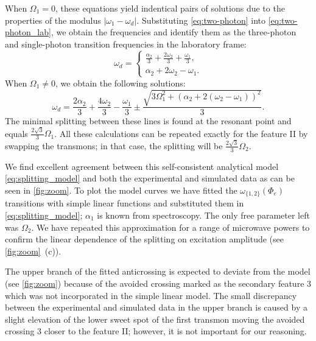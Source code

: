 \documentclass[%
 aps, prx,
 amsmath,amssymb,
 reprint,%
superscriptaddress
]{revtex4-2}
\begin{document}
When $\Omega_1 = 0$, these equations yield indentical pairs of solutions due to the properties of the modulus $|\omega_1 - \omega_d|$. Substituting \autoref{eq:two-photon} into \autoref{eq:two-photon_lab}, we obtain the frequencies and identify them as the three-photon and single-photon transition frequencies in the laboratory frame:
\begin{equation}
\omega_d = \begin{cases} \frac{\alpha_2}{3} + \frac{2 \omega_{2}}{3} + \frac{\omega_{1}}{3}, \\ \alpha_2 + 2 \omega_{2} - \omega_{1}.\end{cases}
\end{equation}
When $\Omega_1 \neq 0$, we obtain the following solutions:
\begin{equation}
\omega_d = \frac{2 \alpha_2}{3} + \frac{4 \omega_{2}}{3} - \frac{\omega_{1}}{3} \pm \frac{\sqrt{3 \Omega_{1}^{2} + \left( \alpha_2 + 2 (\omega_{2} - \omega_{1})\right)^{2}}}{3}.
\label{eq:splitting_model}
\end{equation}
The minimal splitting between these lines is 
found at the resonant point and equals $\frac{2 
\sqrt{3}}{{3}} \Omega_1$. All these calculations 
can be repeated exactly for the feature II by 
swapping the transmons; in that case, the 
splitting will be $\frac{2 \sqrt{3}}{{3}} 
\Omega_2$.

We find excellent agreement between this self-consistent analytical model \autoref{eq:splitting_model} and 
both the experimental and simulated data as can 
be seen in \autoref{fig:zoom}. To plot the model 
curves we have fitted the 
$\omega_{\{1,2\}}(\Phi_e)$ transitions with simple 
linear functions and substituted them in 
\autoref{eq:splitting_model}; $\alpha_1$ is known 
from spectroscopy. The only free parameter left 
was $\Omega_2$. We have repeated this 
approximation for a range of microwave powers to 
confirm the linear dependence of the splitting on 
excitation amplitude (see \autoref{fig:zoom}~(c)).

The upper branch of the fitted anticrossing is expected to deviate from the model (see \autoref{fig:zoom}) because of the avoided crossing marked as the secondary feature 3 which was not incorporated in the simple linear model. The small discrepancy between the experimental and simulated data in the upper branch is caused by a slight elevation of the lower sweet spot of the first transmon moving the avoided crossing 3 closer to the feature II; however, it is not important for our reasoning.	
\end{document}
